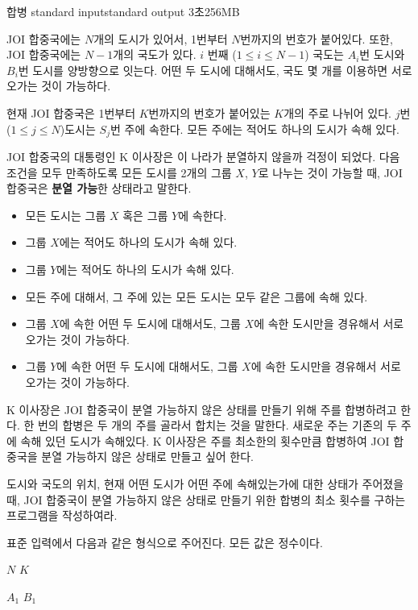 \begin{problem}{합병}
	{standard input}{standard output}
	{3초}{256MB}{}
	
	JOI 합중국에는 $N$개의 도시가 있어서, 1번부터 $N$번까지의 번호가 붙어있다. 또한, JOI 합중국에는 $N-1$개의 국도가 있다. $i$ 번째 ($1 \le i \le N-1$) 국도는 $A_i$번 도시와 $B_i$번 도시를 양방향으로 잇는다. 어떤 두 도시에 대해서도, 국도 몇 개를 이용하면 서로 오가는 것이 가능하다.
	
	현재 JOI 합중국은 1번부터 $K$번까지의 번호가 붙어있는 $K$개의 주로 나뉘어 있다. $j$번 ($1 \le j \le N$)도시는 $S_j$번 주에 속한다. 모든 주에는 적어도 하나의 도시가 속해 있다.
	
	JOI 합중국의 대통령인 K 이사장은 이 나라가 분열하지 않을까 걱정이 되었다. 다음 조건을 모두 만족하도록 모든 도시를 2개의 그룹 $X$, $Y$로 나누는 것이 가능할 때, JOI 합중국은 \textbf{분열 가능}한 상태라고 말한다.
	
	\begin{itemize}
		\item 모든 도시는 그룹 $X$ 혹은 그룹 $Y$에 속한다.
		\item 그룹 $X$에는 적어도 하나의 도시가 속해 있다.
		\item 그룹 $Y$에는 적어도 하나의 도시가 속해 있다.
		\item 모든 주에 대해서, 그 주에 있는 모든 도시는 모두 같은 그룹에 속해 있다.
		\item 그룹 $X$에 속한 어떤 두 도시에 대해서도, 그룹 $X$에 속한 도시만을 경유해서 서로 오가는 것이 가능하다.
		\item 그룹 $Y$에 속한 어떤 두 도시에 대해서도, 그룹 $X$에 속한 도시만을 경유해서 서로 오가는 것이 가능하다.
	\end{itemize}

	K 이사장은 JOI 합중국이 분열 가능하지 않은 상태를 만들기 위해 주를 합병하려고 한다. 한 번의 합병은 두 개의 주를 골라서 합치는 것을 말한다. 새로운 주는 기존의 두 주에 속해 있던 도시가 속해있다. K 이사장은 주를 최소한의 횟수만큼 합병하여 JOI 합중국을 분열 가능하지 않은 상태로 만들고 싶어 한다.
	
	도시와 국도의 위치, 현재 어떤 도시가 어떤 주에 속해있는가에 대한 상태가 주어졌을 때, JOI 합중국이 분열 가능하지 않은 상태로 만들기 위한 합병의 최소 횟수를 구하는 프로그램을 작성하여라.
	
	\InputFile
	
	표준 입력에서 다음과 같은 형식으로 주어진다. 모든 값은 정수이다.
	
	$N$ $K$
	
	$A_1$ $B_1$
	

\end{problem}
